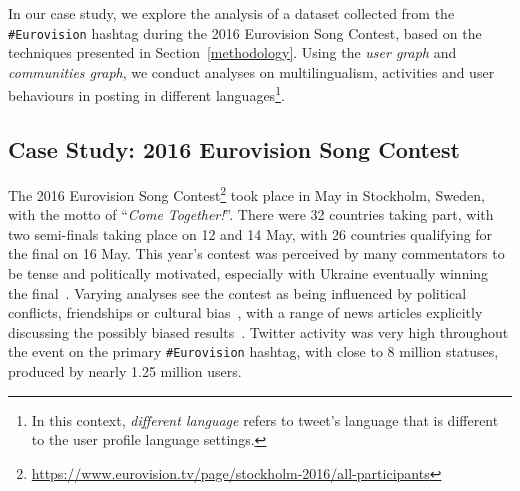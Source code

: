 \documentclass{llncs}
\begin{document}

In our case study, we explore the analysis of a dataset collected from
the {\texttt{\#Eurovision}} hashtag during the 2016 Eurovision Song
Contest, based on the techniques presented in
Section~\ref{methodology}. Using the \emph{user graph} and
\emph{communities graph}, we conduct analyses on multilingualism,
activities and user behaviours in posting in different
languages\footnote{In this context, \emph{different language} refers
to tweet's language that is different to the user profile language
settings.}.

\subsection{Case Study: 2016 Eurovision Song Contest}\label{context}

The 2016 Eurovision Song
Contest\footnote{\url{https://www.eurovision.tv/page/stockholm-2016/all-participants}}
took place in May in Stockholm, Sweden, with the motto of
``{\emph{Come Together!}}''. There were 32 countries taking part, with
two semi-finals taking place on 12 and 14 May, with 26 countries
qualifying for the final on 16 May. This year's contest was perceived
by many commentators to be tense and politically motivated, especially
with Ukraine eventually winning the
final~\cite{telegrapheuroboycott:2016}. Varying analyses see the
contest as being influenced by political conflicts, friendships or
cultural
bias~\cite{ginsburgh+noury:2008,charron:2013,blangiardo+baio:2014,budzinski+pannicke:2016},
with a range of news articles explicitly discussing the possibly
biased results~\cite{telegrapheurobias:2016}.  Twitter activity was
very high throughout the event on the primary {\texttt{\#Eurovision}}
hashtag, with close to 8 million statuses, produced by nearly 1.25
million users.
\end{document}
